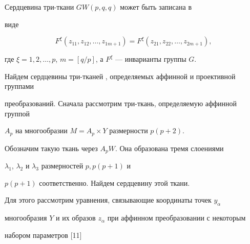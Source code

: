 \begin{thm}


Сердцевина три-ткани $GW(p,q,q)$ может быть записана в


виде


$$


F^{\xi}(z_{11}, z_{12}, \dotsc, z_{1m+1})=F^{\xi}(z_{21}, z_{22},


\dotsc, z_{2m+1}),


$$


где $\xi=1, 2, \dotsc, p$, $m=[q/p]$, а $F^{\xi}$ --- инварианты группы $G$.


\end{thm}





Найдем сердцевины три-тканей , определяемых аффинной и проективной группами


преобразований. Сначала рассмотрим три-ткань, определяемую аффинной группой


$A_{p}$ на многообразии $M=A_{p} \times Y$ размерности $p(p+2)$.


Обозначим такую ткань через $A_{p}W$. Она образована тремя слоениями


$\lambda_{1}$, $\lambda_{2}$ и $\lambda_{3}$ размерностей $p, p(p+1)$ и


$p(p+1)$ соответственно. Найдем сердцевину этой ткани.





Для этого рассмотрим уравнения, связывающие координаты точек $y_{\alpha}$


многообразия $Y$ и их образов $z_{\alpha}$ при аффинном преобразовании с некоторым


набором параметров [11]


